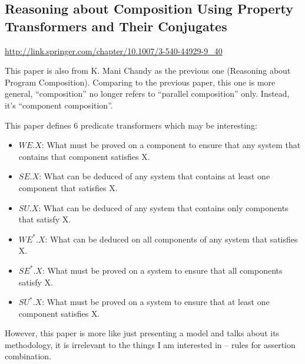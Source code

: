 \documentclass[12pt, fleqn]{article}
\begin{document}
\subsection{Reasoning about Composition Using Property Transformers and Their Conjugates}

\url{http://link.springer.com/chapter/10.1007/3-540-44929-9_40}

\bigskip

This paper is also from K. Mani Chandy as the previous one (Reasoning
about Program Composition). Comparing to the previous paper, this one
is more general, ``composition'' no longer refers to ``parallel
composition'' only. Instead, it's ``component composition''.

This paper defines 6 predicate transformers which may be interesting:

\begin{itemize}
\item $WE.X$: What must be proved on a component to ensure that any
  system that contains that component satisfies X.
\item $SE.X$: What can be deduced of any system that contains at least
  one component that satisfies X.
\item $SU.X$: What can be deduced of any system that contains only
  components that satisfy X.
\item $WE^*.X$: What can be deduced on all components of any system
  that satisfies X.
\item $SE^*.X$: What must be proved on a system to ensure that all
  components satisfy X.
\item $SU^*.X$: What must be proved on a system to ensure that at
  least one component satisfies X.
\end{itemize}

However, this paper is more like just presenting a model and talks
about its methodology, it is irrelevant to the things I am interested
in -- rules for assertion combination.


\end{document}
